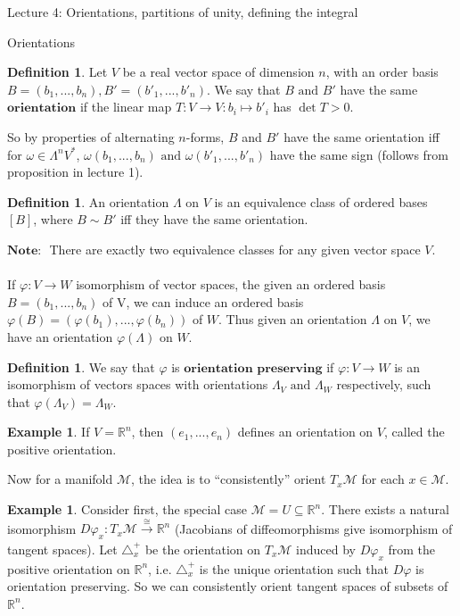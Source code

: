 \documentclass[10pt]{article}
\theoremstyle{plain}
\theoremstyle{definition}
\newtheorem{defn}[thm]{Definition} %
\newtheorem{exmp}[thm]{Example} %
\newcommand{\myand}{\text{ and }}
\newcommand{\Note}{\textbf{Note: }}
\newcommand{\Real}{\mathbb{R}}
\newcommand{\man}{\mathcal{M}}
\newcommand{\xman}{x\in\man}
\newcommand{\setform}[2]{\Lambda^{#1} {#2}}
\newcommand{\allthe}[3]{{#1}_{#2},...,{#1}_{#3}}
\newcommand{\tang}{T_x\man}
\begin{document}
\begin{section}{Lecture 4: Orientations, partitions of unity, defining the integral}
\begin{subsection}{Orientations}
\begin{defn}
Let $V$ be a real vector space of dimension $n$, with an order basis $B = (\allthe{b}{1}{n}), B' = (\allthe{b'}{1}{n}).$ We say that $B \myand B'$ have the same $\textbf{orientation}$ if the linear map $T:V\to V : b_i \mapsto b'_i$ has $\det T > 0.$
\end{defn}
So by properties of alternating $n$-forms, $B$ and $B'$ have the same orientation iff for $\omega \in \setform{n}{V^*}$, $ \omega (\allthe{b}{1}{n}) \myand \omega(\allthe{b'}{1}{n})$ have the same sign (follows from proposition in lecture 1).
\begin{defn}
An orientation $\Lambda$ on $V$ is an equivalence class of ordered bases $[B]$, where $B \sim B'$ iff they have the same orientation.
\end{defn}
$\Note$ There are exactly two equivalence classes for any given vector space $V$.
\\\\
If $\varphi : V \to W$ isomorphism of vector spaces, the given an ordered basis $B = (\allthe{b}{1}{n}) $ of V, we can induce an ordered basis $\varphi(B) = (\varphi(b_1),...,\varphi(b_n))$ of $W$. Thus given an orientation $\Lambda$ on $V$,  we have an orientation $\varphi(\Lambda)$ on $W$.
\begin{defn}
We say that $\varphi$ is $\textbf{orientation preserving}$ if $\varphi: V \to W$ is an isomorphism of vectors spaces with orientations $\Lambda_V \myand \Lambda_W$ respectively, such that $\varphi(\Lambda_V) = \Lambda_W$.
\end{defn}
\begin{exmp}
If $V = \Real^n$, then $(\allthe{e}{1}{n})$ defines an orientation on $V$, called the positive orientation.
\end{exmp}\noindent
Now for a manifold $\man$, the idea is to ``consistently'' orient $\tang$ for each $\xman$. 
\begin{exmp}
Consider first, the special case $\man = U \subseteq \Real^n$. There exists a natural isomorphism $D\varphi _ x : \tang \xrightarrow[]{\cong} \Real^n$ (Jacobians of diffeomorphisms give isomorphism of tangent spaces). Let $\triangle_x^+$ be the orientation on $\tang$ induced by $D\varphi_x$ from the positive orientation on $\Real^n$, i.e. $\triangle_x^+$ is the unique orientation such that $D\varphi$ is orientation preserving. So we can consistently orient tangent spaces of subsets of $\Real^n$.

\end{exmp}
\end{subsection}
\end{section}
\end{document}
